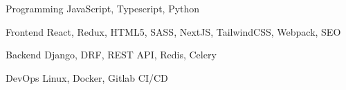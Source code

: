 

\begin{cvskills}

  \cvskill
    {Programming} %
    {JavaScript, Typescript, Python} %

  \cvskill
    {Frontend} %
    {React, Redux, HTML5, SASS, NextJS, TailwindCSS, Webpack, SEO} %

  \cvskill
    {Backend} %
    {Django, DRF, REST API, Redis, Celery} %
    
  \cvskill
    {DevOps} %
    {Linux, Docker, Gitlab CI/CD} %

\end{cvskills}
